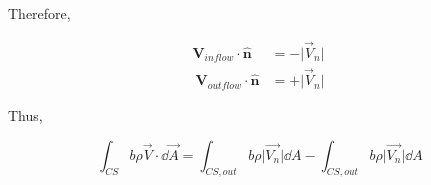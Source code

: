\documentclass[../main.tex]{subfiles}
\begin{document}
\begin{enumerate}[label = (\alph*)]
        Therefore, 

        \begin{align*}
            \mathbf{V}_{inflow} \cdot \hat{\mathbf{n}} &= - \lvert{\vec{V}_n}\rvert\\\
            \mathbf{V}_{outflow} \cdot \hat{\mathbf{n}} &= + \lvert{\vec{V}_n}\rvert\
        \end{align*}

        Thus,

        \[
            \int_{CS} b \rho \vec{V} \cdot \dd \vec{A}
            =
            \int_{CS,out} b \rho \lvert{\vec{V_n}}\rvert \dd A -%
            \int_{CS,out} b \rho \lvert{\vec{V_n}}\rvert \dd A
        \]
        

\end{enumerate}
\end{document}
